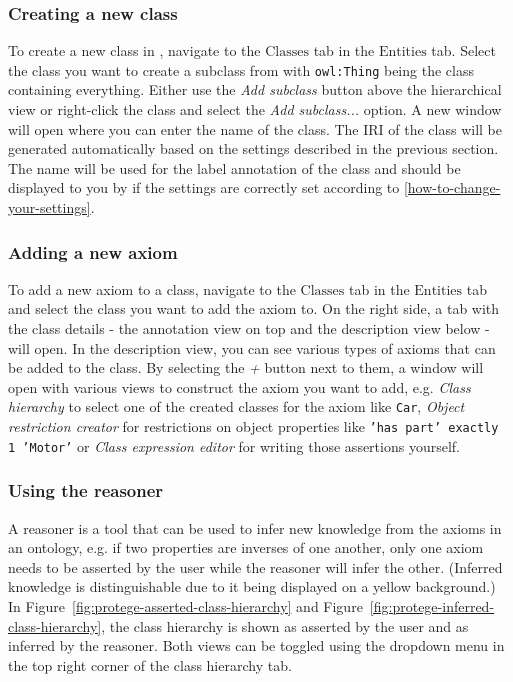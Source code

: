 \subsubsection{Creating a new class}
To create a new class in {\protege}, navigate to the \textit{$\text{Classes}$} tab in the \textit{$\text{Entities}$} tab. Select the class you want to create a subclass from with \texttt{owl:Thing} being the class containing everything. Either use the \textit{Add subclass} button above the hierarchical view or right-click the class and select the \textit{Add subclass...} option. A new window will open where you can enter the name of the class. The IRI of the class will be generated automatically based on the settings described in the previous section. The name will be used for the label annotation of the class and should be displayed to you by {\protege} if the settings are correctly set according to \ref{how-to-change-your-settings}.


\subsubsection{Adding a new axiom}
To add a new axiom to a class, navigate to the \textit{$\text{Classes}$} tab in the \textit{$\text{Entities}$} tab and select the class you want to add the axiom to. On the right side, a tab with the class details - the annotation view on top and the description view below - will open. In the description view, you can see various types of axioms that can be added to the class. By selecting the \textit{+} button next to them, a window will open with various views to construct the axiom you want to add, e.g. \textit{Class hierarchy} to select one of the created classes for the axiom like \texttt{Car}, \textit{Object restriction creator} for restrictions on object properties like \texttt{'has part' exactly 1 'Motor'} or \textit{Class expression editor} for writing those assertions yourself.


\subsubsection{Using the reasoner}
A reasoner is a tool that can be used to infer new knowledge from the axioms in an ontology, e.g. if two properties are inverses of one another, only one axiom needs to be asserted by the user while the reasoner will infer the other. (Inferred knowledge is distinguishable due to it being displayed on a yellow background.)
In Figure~\ref{fig:protege-asserted-class-hierarchy} and Figure~\ref{fig:protege-inferred-class-hierarchy}, the class hierarchy is shown as asserted by the user and as inferred by the reasoner. Both views can be toggled using the dropdown menu in the top right corner of the class hierarchy tab.

